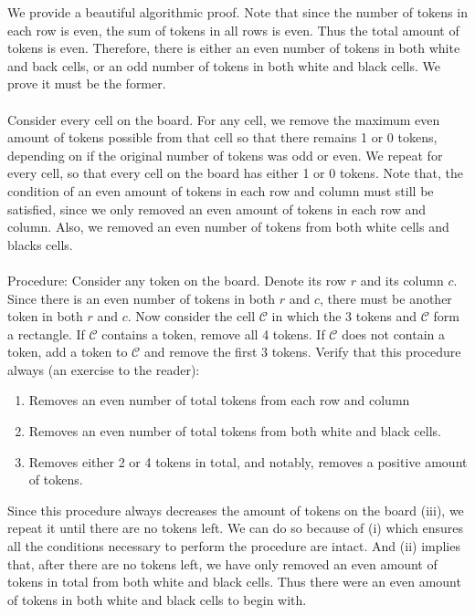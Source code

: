 \begin{enumerate}[align=left,start=1,label=\textbf{\textcolor{meablue}{Problem \arabic*}}]
    \begin{solution}
        We provide a beautiful algorithmic proof. Note that since the number of tokens in each row is even, the sum of tokens in all rows is even.  Thus the total amount of tokens is even. Therefore, there is either an even number of tokens in both white and back cells, or an odd number of tokens in both white and black cells. We prove it must be the former. 
        \\ \\
        Consider every cell on the board. For any cell, we remove the maximum even amount of tokens possible from that cell so that there remains 1 or 0 tokens, depending on if the original number of tokens was odd or even. We repeat for every cell, so that every cell on the board has either 1 or 0 tokens. Note that, the condition of an even amount of tokens in each row and column must still be satisfied, since we only removed an even amount of tokens in each row and column. Also, we removed an even number of tokens from both white cells and blacks cells.
        \\ \\ 
        Procedure: Consider any token on the board. Denote its row $r$ and its column $c$. Since there is an even number of tokens in both $r$ and $c$, there must be another token in both $r$ and $c$. Now consider the cell $\mathcal{C}$ in which the 3 tokens and $\mathcal{C}$ form a rectangle. If $\mathcal{C}$ contains a token, remove all 4 tokens. If $\mathcal{C}$ does not contain a token, add a token to $\mathcal{C}$ and remove the first 3 tokens. Verify that this procedure always (an exercise to the reader):
        \begin{enumerate}[label=(\roman*)]
            \item Removes an even number of total tokens from each row and column
            \item Removes an even number of total tokens from both white and black cells.
            \item Removes either 2 or 4 tokens in total, and notably, removes a positive amount of tokens.
        \end{enumerate}
        Since this procedure always decreases the amount of tokens on the board (iii), we repeat it until there are no tokens left. We can do so because of (i) which ensures all the conditions necessary to perform the procedure are intact. And (ii) implies that, after there are no tokens left, we have only removed an even amount of tokens in total from both white and black cells. Thus there were an even amount of tokens in both white and black cells to begin with.


\end{solution}
\end{enumerate}
